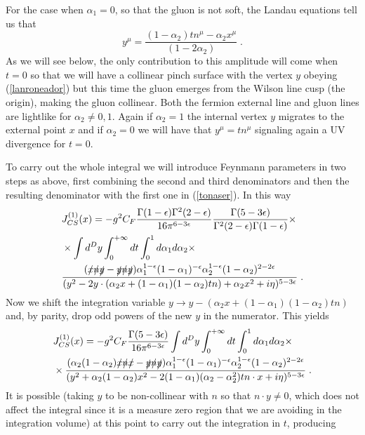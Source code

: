 \documentclass[%
 reprint,
 amsmath,amssymb,
 aps,
]{revtex4-1}
\begin{document}
For the case when $\alpha_1=0$, so that the gluon is not soft, the Landau equations tell us that
\begin{equation}
y^\mu=\frac{(1-\alpha_2)tn^\mu-\alpha_2 x^\mu}{(1-2\alpha_2)}\;.
\end{equation}
As we will see below, the only contribution to this amplitude will come when $t=0$ so that we will have a collinear pinch surface with the vertex $y$ obeying (\ref{lanroneador}) but this time the gluon emerges from the Wilson line cusp (the origin), making the gluon collinear. Both the fermion external line and gluon lines are lightlike for $\alpha_2\neq0,1$. Again if $\alpha_2=1$ the internal vertex $y$ migrates to the external point $x$ and if $\alpha_2=0$ we will have that $y^\mu=tn^\mu$ signaling again a UV divergence for $t=0$.
\par
To carry out the whole integral we will introduce Feynmann parameters in two steps as above, first combining the second and third denominators and then the resulting denominator with the first one in (\ref{tonaser}). In this way
\begin{align}
&J^{(1)}_{CS}(x)=-g^2 C_F\frac{\Gamma(1-\epsilon)\Gamma^2(2-\epsilon)}{16\pi^{6-3\epsilon}}\frac{\Gamma(5-3\epsilon)}{\Gamma^2(2-\epsilon)\Gamma(1-\epsilon)}\times\nonumber\\
&\times\int d^D y\int_0^{+\infty}dt\int_0^1 d\alpha_1d\alpha_2\nonumber\times\\
&\frac{(\slashed{x}\slashed{n}\slashed{y}-\slashed{y}\slashed{n}\slashed{y})\alpha_1^{1-\epsilon}(1-\alpha_1)^{-\epsilon}\alpha_2^{1-\epsilon}(1-\alpha_2)^{2-2\epsilon}}{(y^2-2y\cdot(\alpha_2 x+(1-\alpha_1)(1-\alpha_2)tn)+\alpha_2 x^2+i\eta)^{5-3\epsilon}}\;.
\end{align}
Now we shift the integration variable $y\to y-(\alpha_2 x+(1-\alpha_1)(1-\alpha_2)tn)$ and, by parity, drop odd powers of the new $y$ in the numerator. This yields
\begin{align}
&J^{(1)}_{CS}(x)=-g^2 C_F\frac{\Gamma(5-3\epsilon)}{16\pi^{6-3\epsilon}}\int d^D y\int_0^{+\infty}dt\int_0^1 d\alpha_1d\alpha_2\times\nonumber\\
&\times\frac{(\alpha_2(1-\alpha_2)\slashed{x}\slashed{n}\slashed{x}-\slashed{y}\slashed{n}\slashed{y})\alpha_1^{1-\epsilon}(1-\alpha_1)^{-\epsilon}\alpha_2^{1-\epsilon}(1-\alpha_2)^{2-2\epsilon}}{(y^2+\alpha_2(1-\alpha_2) x^2-2(1-\alpha_1)(\alpha_2-\alpha_2^2)tn\cdot x+i\eta)^{5-3\epsilon}}\;.
\end{align}
It is possible (taking $y$ to be non-collinear with $n$ so that $n\cdot y\neq0$, which does not affect the integral since it is a measure zero region that we are avoiding in the integration volume) at this point to carry out the integration in $t$, producing
\end{document}
